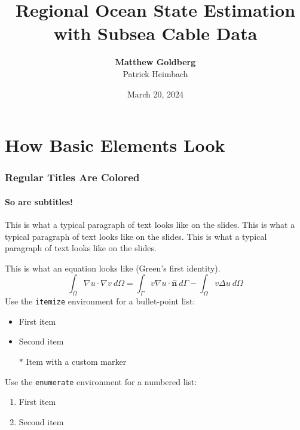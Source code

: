 \documentclass[10pt, aspectratio=169]{oden_beamer}
\begin{document}

\title{Regional Ocean State Estimation with Subsea Cable Data}
\author{\textbf{Matthew Goldberg}\\
        Patrick Heimbach
}
\date{
    \centering
    March 20, 2024
}

\begin{frame} %
\titlepage
\end{frame}

\section{How Basic Elements Look} %

\begin{frame} %
\frametitle{Regular Titles Are Colored}
\framesubtitle{So are subtitles!}

This is what a typical paragraph of text looks like on the slides.
This is what a typical paragraph of text looks like on the slides.
This is what a typical paragraph of text looks like on the slides.

\vspace{.5cm}
This is what an equation looks like (Green's first identity).
\begin{equation*}
    \int_{\Omega} \nabla u \cdot \nabla v \:d\Omega
    = \int_{\Gamma} v \nabla u \cdot \hat{\mathbf{n}} \:d\Gamma
    - \int_{\Omega} v \Delta u \:d\Omega
\end{equation*}
Use the \texttt{itemize} environment for a bullet-point list:
\begin{itemize}
    \item First item
    \item Second item
    \item[$\ast$] Item with a custom marker
\end{itemize}

Use the \texttt{enumerate} environment for a numbered list:
\begin{enumerate}
    \item First item
    \item Second item
\end{enumerate}
\end{frame}
\end{document}

